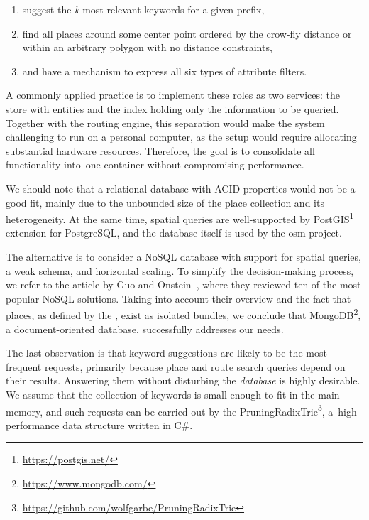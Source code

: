 \begin{enumerate}
\item suggest the \emph{k} most relevant keywords for a given prefix,
\item find all places around some center point ordered by the crow-fly distance or within an arbitrary polygon with no distance constraints,
\item and have a mechanism to express all six types of attribute filters.
\end{enumerate}

A commonly applied practice is to implement these roles as two services: the store with entities and the index holding only the information to be queried. Together with the routing engine, this separation would make the system challenging to run on a personal computer, as the setup would require allocating substantial hardware resources. Therefore, the goal is to consolidate all func\-tion\-al\-ity into~one container without compromising performance.

We should note that a relational database with ACID properties would not be a good fit, mainly due to the unbounded size of the place collection and its heterogeneity. At the same time, spatial queries are well-supported by PostGIS\footnote{\href{https://postgis.net/}{https://postgis.net/}} extension for PostgreSQL, and the database itself is used by the \acs{osm} project.

The alternative is to consider a NoSQL database with support for spatial queries, a weak schema, and horizontal scaling. To simplify the decision-making process, we refer to the article by Guo and Onstein~\cite{guo20}, where they reviewed ten of the most popular NoSQL solutions. Taking into account their overview and the fact that places, as defined by the \emph{}, exist as isolated bundles, we conclude that MongoDB\footnote{\href{https://www.mongodb.com/}{https://www.mongodb.com/}}, a document-oriented database, successfully addresses our needs.

The last observation is that keyword suggestions are likely to be the most frequent requests, primarily because place and route search queries depend on their results. Answering them without disturbing the \emph{database} is highly desirable. We assume that the collection of keywords is small enough to fit in the main memory, and such requests can be carried out by the PruningRadixTrie\footnote{\href{https://github.com/wolfgarbe/PruningRadixTrie}{https://github.com/wolfgarbe/PruningRadixTrie}}, a~high-performance data structure written in C\#.

